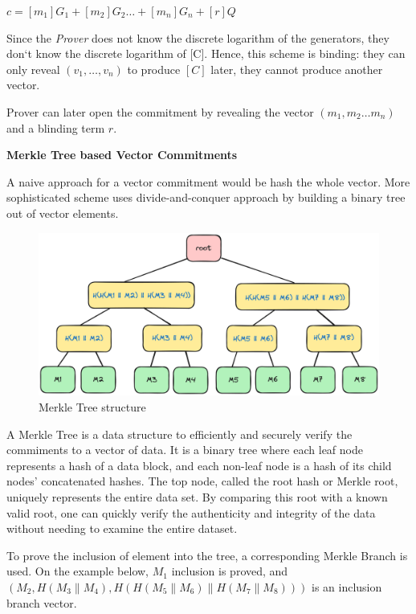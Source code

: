 \documentclass[../lecture-notes.tex]{subfiles}
\begin{document}
\begin{center}
    $ c = [m_1] G_1 + [m_2] G_2 \ldots + [m_n] G_n + [r] Q$ 
\end{center}

Since the \textit{Prover} does not know the discrete logarithm of the generators, they don`t know the discrete logarithm of [C]. 
Hence, this scheme is binding: they can only reveal $(v_1, \ldots ,v_n)$ to produce $[C]$ later, they cannot produce another vector.

Prover can later open the commitment by revealing the vector $(m_1, m_2 \ldots m_n)$ and a blinding term $r$.

\textbf{Merkle Tree based Vector Commitments}

A naive approach for a vector commitment would be hash the whole vector. More sophisticated scheme uses divide-and-conquer approach by building a binary tree out of vector elements.

\begin{figure}[H]
    \centering\includegraphics[width=0.9\linewidth, clip]{images/lecture_5/MerkleTree.png}

    \caption{Merkle Tree structure}
\end{figure}

A Merkle Tree is a data structure to efficiently and securely verify the commiments to a vector of data. It is a binary tree where each leaf node represents a hash of a data block, and each non-leaf node is a hash of its child nodes' concatenated hashes. The top node, called the root hash or Merkle root, uniquely represents the entire data set. By comparing this root with a known valid root, one can quickly verify the authenticity and integrity of the data without needing to examine the entire dataset. 

To prove the inclusion of element into the tree, a corresponding Merkle Branch is used. On the example below, $M_1$ inclusion is proved, and 
$(M_2, H(M_3 \parallel M_4), H(H(M_5 \parallel M_6) \parallel H(M_7 \parallel M_8)))$ is an inclusion branch vector.
\end{document}
